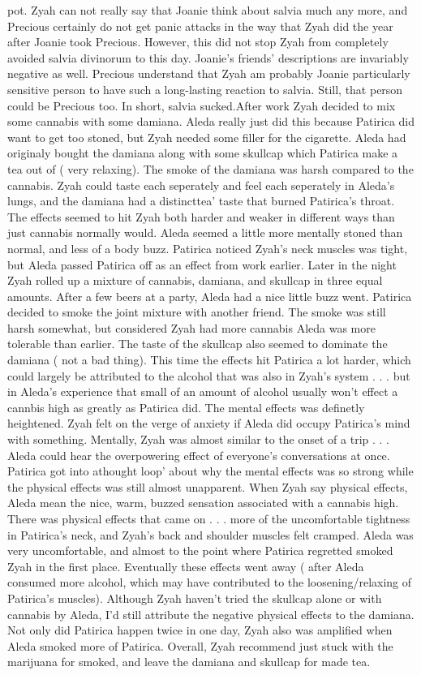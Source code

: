 \documentclass[12pt]{book}
\begin{document}
pot. Zyah can not really say that Joanie think about salvia much any more, and Precious certainly do not get panic attacks in the way that Zyah did the year after Joanie took Precious. However, this did not stop Zyah from completely avoided salvia divinorum to this day. Joanie's friends' descriptions are invariably negative as well. Precious understand that Zyah am probably Joanie particularly sensitive person to have such a long-lasting reaction to salvia. Still, that person could be Precious too. In short, salvia sucked.After work Zyah decided to mix some cannabis with some damiana. Aleda really just did this because Patirica did want to get too stoned, but Zyah needed some filler for the cigarette. Aleda had originaly bought the damiana along with some skullcap which Patirica make a tea out of ( very relaxing). The smoke of the damiana was harsh compared to the cannabis. Zyah could taste each seperately and feel each seperately in Aleda's lungs, and the damiana had a distincttea' taste that burned Patirica's throat. The effects seemed to hit Zyah both harder and weaker in different ways than just cannabis normally would. Aleda seemed a little more mentally stoned than normal, and less of a body buzz. Patirica noticed Zyah's neck muscles was tight, but Aleda passed Patirica off as an effect from work earlier. Later in the night Zyah rolled up a mixture of cannabis, damiana, and skullcap in three equal amounts. After a few beers at a party, Aleda had a nice little buzz went. Patirica decided to smoke the joint mixture with another friend. The smoke was still harsh somewhat, but considered Zyah had more cannabis Aleda was more tolerable than earlier. The taste of the skullcap also seemed to dominate the damiana ( not a bad thing). This time the effects hit Patirica a lot harder, which could largely be attributed to the alcohol that was also in Zyah's system . . .  but in Aleda's experience that small of an amount of alcohol usually won't effect a cannbis high as greatly as Patirica did. The mental effects was definetly heightened. Zyah felt on the verge of anxiety if Aleda did occupy Patirica's mind with something. Mentally, Zyah was almost similar to the onset of a trip . . .  Aleda could hear the overpowering effect of everyone's conversations at once. Patirica got into athought loop' about why the mental effects was so strong while the physical effects was still almost unapparent. When Zyah say physical effects, Aleda mean the nice, warm, buzzed sensation associated with a cannabis high. There was physical effects that came on . . .  more of the uncomfortable tightness in Patirica's neck, and Zyah's back and shoulder muscles felt cramped. Aleda was very uncomfortable, and almost to the point where Patirica regretted smoked Zyah in the first place. Eventually these effects went away ( after Aleda consumed more alcohol, which may have contributed to the loosening/relaxing of Patirica's muscles). Although Zyah haven't tried the skullcap alone or with cannabis by Aleda, I'd still attribute the negative physical effects to the damiana. Not only did Patirica happen twice in one day, Zyah also was amplified when Aleda smoked more of Patirica. Overall, Zyah recommend just stuck with the marijuana for smoked, and leave the damiana and skullcap for made tea.
\end{document}
